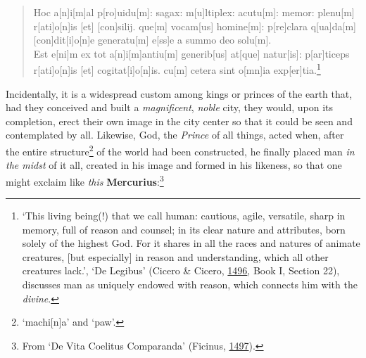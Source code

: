 \documentclass[
]{article}
\begin{document}
\begin{quote}
Hoc a{[}n{]}i{[}m{]}al p{[}ro{]}uidu{[}m{]}: sagax: m{[}u{]}ltiplex:
acutu{[}m{]}: memor: plenu{[}m{]} r{[}ati{]}o{[}n{]}is {[}et{]}
{[}con{]}silij. que{[}m{]} vocam{[}us{]} homine{[}m{]}: p{[}re{]}clara
q{[}ua{]}da{[}m{]} {[}con{]}dit{[}i{]}o{[}n{]}e generatu{[}m{]}
e{[}ss{]}e a summo deo solu{[}m{]}.\\
Est e{[}ni{]}m ex tot a{[}n{]}i{[}m{]}antiu{[}m{]} generib{[}us{]}
at{[}que{]} natur{[}is{]}: p{[}ar{]}ticeps r{[}ati{]}o{[}n{]}is {[}et{]}
cogitat{[}i{]}o{[}n{]}is. cu{[}m{]} cetera sint o{[}mn{]}ia
exp{[}er{]}tia.\footnote{`This living being(!) that we call human:
  cautious, agile, versatile, sharp in memory, full of reason and
  counsel; in its clear nature and attributes, born solely of the
  highest God. For it shares in all the races and natures of animate
  creatures, {[}but especially{]} in reason and understanding, which all
  other creatures lack.', `De Legibus' (Cicero \& Cicero,
  \href{https://doi.org/10.3931/e-rara-89116}{1496}, Book I, Section
  22), discusses man as uniquely endowed with reason, which connects him
  with the \emph{divine}.}
\end{quote}

Incidentally, it is a widespread custom among kings or princes of the
earth that, had they conceived and built a \emph{magnificent},
\emph{noble} city, they would, upon its completion, erect their own
image in the city center so that it could be seen and contemplated by
all. Likewise, God, the \emph{Prince} of all things, acted when, after
the entire structure\footnote{`machi{[}n{]}a' and `paw'.} of the world
had been constructed, he finally placed man \emph{in the midst} of it
all, created in his image and formed in his likeness, so that one might
exclaim like \emph{this} \textbf{Mercurius}:\footnote{From `De Vita
  Coelitus Comparanda' (Ficinus,
  \href{https://doi.org/10.3931/e-rara-68641}{1497}).}
\end{document}
